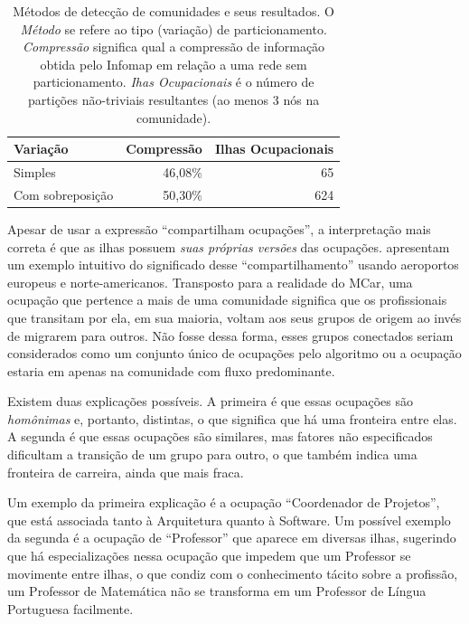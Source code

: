\documentclass[
  article,
  11pt,
  a4paper,
  english,
  brazil,
  sumario=tradicional]{abntex2}
\begin{document}
\begin{table}
  \centering
  \begin{tabular}{@{} l r r @{}}
  	\toprule
  	Variação         & Compressão & Ilhas Ocupacionais \\
    \midrule
  	Simples          & 46,08\%    & 65                \\
  	Com sobreposição & 50,30\%    & 624                \\
    \bottomrule
  \end{tabular}
  \caption{Métodos de detecção de comunidades e seus resultados. O \textit{Método} se refere ao tipo (variação) de particionamento. \textit{Compressão} significa qual a compressão de informação obtida pelo Infomap em relação a uma rede sem particionamento. \textit{Ihas Ocupacionais} é o número de partições não-triviais resultantes (ao menos 3 nós na comunidade).}
  \label{tab:metodos}
\end{table}

Apesar de usar a expressão \enquote{compartilham ocupações}, a interpretação mais correta é que as ilhas possuem \textit{suas próprias versões} das ocupações.  apresentam um exemplo intuitivo do significado desse \enquote{compartilhamento} usando aeroportos europeus e norte-americanos. Transposto para a realidade do MCar, uma ocupação que pertence a mais de uma comunidade significa que os profissionais que transitam por ela, em sua maioria, voltam aos seus grupos de origem ao invés de migrarem para outros. Não fosse dessa forma, esses grupos conectados seriam considerados como um conjunto único de ocupações pelo algoritmo ou a ocupação estaria em apenas na comunidade com fluxo predominante.

Existem duas explicações possíveis. A primeira é que essas ocupações são \textit{homônimas} e, portanto, distintas, o que significa que há uma fronteira entre elas. A segunda é que essas ocupações são similares, mas fatores não especificados dificultam a transição de um grupo para outro, o que também indica uma fronteira de carreira, ainda que mais fraca.

Um exemplo da primeira explicação é a ocupação \enquote{Coordenador de Projetos}, que está associada tanto à Arquitetura quanto à Software. Um possível exemplo da segunda é a ocupação de \enquote{Professor} que aparece em diversas ilhas, sugerindo que há especializações nessa ocupação que impedem que um Professor se movimente entre ilhas, o que condiz com o conhecimento tácito sobre a profissão, um Professor de Matemática não se transforma em um Professor de Língua Portuguesa facilmente.
\end{document}
